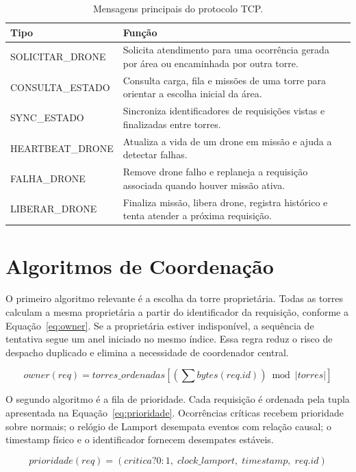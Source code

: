 \documentclass[12pt]{article}
\begin{document}
\begin{table}[H]
\centering
\caption{Mensagens principais do protocolo TCP.}
\label{tab:mensagens}
\begin{tabularx}{\textwidth}{>{\ttfamily}p{3.8cm}X}
\toprule
Tipo & Função \\
\midrule
SOLICITAR\_DRONE & Solicita atendimento para uma ocorrência gerada por área ou encaminhada por outra torre. \\
CONSULTA\_ESTADO & Consulta carga, fila e missões de uma torre para orientar a escolha inicial da área. \\
SYNC\_ESTADO & Sincroniza identificadores de requisições vistas e finalizadas entre torres. \\
HEARTBEAT\_DRONE & Atualiza a vida de um drone em missão e ajuda a detectar falhas. \\
FALHA\_DRONE & Remove drone falho e replaneja a requisição associada quando houver missão ativa. \\
LIBERAR\_DRONE & Finaliza missão, libera drone, registra histórico e tenta atender a próxima requisição. \\
\bottomrule
\end{tabularx}
\end{table}

\section{Algoritmos de Coordenação}

O primeiro algoritmo relevante é a escolha da torre proprietária. Todas as torres calculam a mesma proprietária a partir do identificador da requisição, conforme a Equação~\ref{eq:owner}. Se a proprietária estiver indisponível, a sequência de tentativa segue um anel iniciado no mesmo índice. Essa regra reduz o risco de despacho duplicado e elimina a necessidade de coordenador central.

\begin{equation}
\label{eq:owner}
owner(req) = torres\_ordenadas\left[\left(\sum bytes(req.id)\right) \bmod |torres|\right]
\end{equation}

O segundo algoritmo é a fila de prioridade. Cada requisição é ordenada pela tupla apresentada na Equação~\ref{eq:prioridade}. Ocorrências críticas recebem prioridade sobre normais; o relógio de Lamport desempata eventos com relação causal; o timestamp físico e o identificador fornecem desempates estáveis.

\begin{equation}
\label{eq:prioridade}
prioridade(req) = (critica?0:1,\; clock\_lamport,\; timestamp,\; req.id)
\end{equation}
\end{document}
